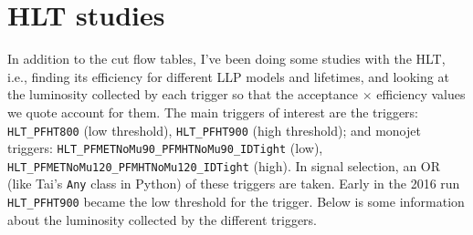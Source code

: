 \section{HLT studies}

In addition to the cut flow tables, I've been doing some studies with the HLT, i.e., finding its efficiency for different LLP models and lifetimes, and looking at the luminosity collected by each trigger so that the acceptance $\times$ efficiency values we quote account for them. The main triggers of interest are the \HT triggers: \texttt{HLT\_PFHT800} (low threshold), \texttt{HLT\_PFHT900} (high threshold); and monojet triggers: \texttt{HLT\_PFMETNoMu90\_PFMHTNoMu90\_IDTight} (low),  \texttt{HLT\_PFMETNoMu120\_PFMHTNoMu120\_IDTight} (high). In signal selection, an OR (like Tai's \texttt{Any} class in Python) of these triggers are taken. Early in the 2016 run \texttt{HLT\_PFHT900} became the low threshold for the \HT trigger. Below is some information about the luminosity collected by the different triggers.

\begin{table}[htbp]
\caption{The luminosity collected by each HLT, or combination of Triggers, from the entire 2016 run. Over the course of the run, the threshold for the lowest unprescaled trigger in each category rose. The fraction of luminosity collected by each Trigger whilst it was lowest threshold is included.}
\end{table}


